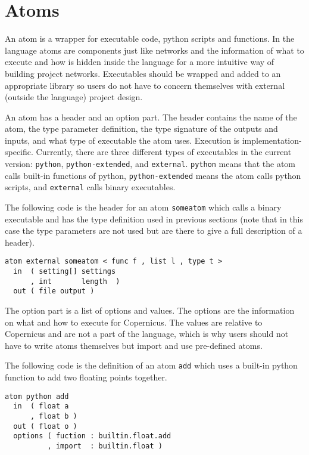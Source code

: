 \section{Atoms}\label{sec:atom}
An atom is a wrapper for executable code, python scripts and
functions. In the language atoms are components just like networks and
the information of what to execute and how is hidden inside the
language for a more intuitive way of building project
networks. Executables should be wrapped and added to an appropriate
library so users do not have to concern themselves with external
(outside the language) project design.

An atom has a header and an option part. The header contains the name
of the atom, the type parameter definition, the type signature of the
outputs and inputs, and what type of executable the atom uses.
Execution is implementation-specific. Currently, there are three
different types of executables in the current version: \verb#python#,
\verb#python-extended#, and \verb#external#. \verb#python# means that
the atom calls built-in functions of python, \verb#python-extended#
means the atom calls python scripts, and \verb#external# calls binary
executables.

The following code is the header for an atom \verb#someatom# which
calls a binary executable and has the type definition used in previous
sections (note that in this case the type parameters are not used but
are there to give a full description of a header).

\begin{verbatim}
atom external someatom < func f , list l , type t >
  in  ( setting[] settings
      , int       length  )
  out ( file output )
\end{verbatim}

The option part is a list of options and values. The options are the
information on what and how to execute for Copernicus. The values are
relative to Copernicus and are not a part of the language, which is
why users should not have to write atoms themselves but import and use
pre-defined atoms.

The following code is the definition of an atom \verb#add# which uses
a built-in python function to add two floating points together.

\begin{verbatim}
atom python add
  in  ( float a
      , float b )
  out ( float o )
  options ( fuction : builtin.float.add
          , import  : builtin.float )
\end{verbatim}

